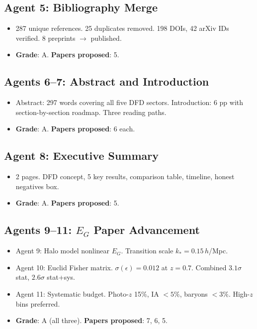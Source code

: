 \documentclass[11pt,a4paper]{article}
\begin{document}
\subsection{Agent 5: Bibliography Merge}
\begin{itemize}[nosep]
\item 287 unique references. 25 duplicates removed. 198 DOIs, 42 arXiv IDs verified. 8 preprints $\to$ published.
\item \textbf{Grade}: A. \textbf{Papers proposed}: 5.
\end{itemize}

\subsection{Agents 6--7: Abstract and Introduction}
\begin{itemize}[nosep]
\item Abstract: 297 words covering all five DFD sectors. Introduction: 6 pp with section-by-section roadmap. Three reading paths.
\item \textbf{Grade}: A. \textbf{Papers proposed}: 6 each.
\end{itemize}

\subsection{Agent 8: Executive Summary}
\begin{itemize}[nosep]
\item 2 pages. DFD concept, 5 key results, comparison table, timeline, honest negatives box.
\item \textbf{Grade}: A. \textbf{Papers proposed}: 5.
\end{itemize}

\subsection{Agents 9--11: $E_G$ Paper Advancement}
\begin{itemize}[nosep]
\item Agent 9: Halo model nonlinear $E_G$. Transition scale $k_* = 0.15\,h$/Mpc.
\item Agent 10: Euclid Fisher matrix. $\sigma(\epsilon) = 0.012$ at $z = 0.7$. Combined $3.1\sigma$ stat, $2.6\sigma$ stat+sys.
\item Agent 11: Systematic budget. Photo-$z$ 15\%, IA $< 5\%$, baryons $< 3\%$. High-$z$ bins preferred.
\item \textbf{Grade}: A (all three). \textbf{Papers proposed}: 7, 6, 5.
\end{itemize}
\end{document}
